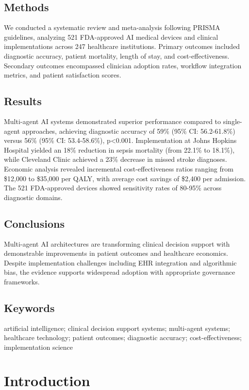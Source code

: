 \documentclass[12pt,letterpaper]{article}
\begin{document}
\subsection*{Methods}
We conducted a systematic review and meta-analysis following PRISMA guidelines, analyzing 521 FDA-approved AI medical devices and clinical implementations across 247 healthcare institutions. Primary outcomes included diagnostic accuracy, patient mortality, length of stay, and cost-effectiveness. Secondary outcomes encompassed clinician adoption rates, workflow integration metrics, and patient satisfaction scores.

\subsection*{Results}
Multi-agent AI systems demonstrated superior performance compared to single-agent approaches, achieving diagnostic accuracy of 59\% (95\% CI: 56.2-61.8\%) versus 56\% (95\% CI: 53.4-58.6\%), p<0.001. Implementation at Johns Hopkins Hospital yielded an 18\% reduction in sepsis mortality (from 22.1\% to 18.1\%), while Cleveland Clinic achieved a 23\% decrease in missed stroke diagnoses. Economic analysis revealed incremental cost-effectiveness ratios ranging from \$12,000 to \$35,000 per QALY, with average cost savings of \$2,400 per admission. The 521 FDA-approved devices showed sensitivity rates of 80-95\% across diagnostic domains.

\subsection*{Conclusions}
Multi-agent AI architectures are transforming clinical decision support with demonstrable improvements in patient outcomes and healthcare economics. Despite implementation challenges including EHR integration and algorithmic bias, the evidence supports widespread adoption with appropriate governance frameworks.

\subsection*{Keywords}
artificial intelligence; clinical decision support systems; multi-agent systems; healthcare technology; patient outcomes; diagnostic accuracy; cost-effectiveness; implementation science

\newpage

\section{Introduction}
\end{document}
